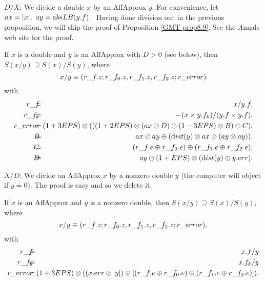 $D/X$:
We   divide a double $x$ by an AffApprox $y$.
For convenience, let $ax = |x|,\ ay = {\textrm absLB}(y.f).\ $  Having done division out in the previous proposition, we will skip the proof of Proposition \ref{GMT prop8.9}.  See the {\textit Annals}
web site for the proof.

\begin{proposition}\label{GMT prop8.9} If $x$ is a double and $y$ is an 
{\textrm AffApprox}  with $D > 0$ {\textrm (}\/see below{\textrm ),}
 then $S(x / y) \supseteq S(x) / S(y)${\textrm ,} where
$$x / y \equiv (r\_f.z; r\_f_0.z, r\_f_1.z, r\_f_2.z; r\_{\textrm error})$$
with
 \begin{eqnarray*}
r\_f&\hskip-8pt =\hskip-8pt& x / y.f,\\
r\_f_k&\hskip-8pt =\hskip-8pt& -(x \times y.f_k)/ (y.f \times y.f),\\
r\_{\textrm error}&\hskip-8pt =\hskip-8pt& (1+3EPS) \otimes ( 
((1 + 2EPS) \otimes (ax  \oslash D) \ominus (1 - 3EPS) \otimes B)
\oplus C),\\
 B&\hskip-8pt =\hskip-8pt& ax \oslash ay  \oplus ({\textrm dist}(y) \otimes ax \oslash (ay \otimes ay)),\\
C& \hskip-8pt=\hskip-8pt& (r\_f.e \oplus r\_f_0.e)
\oplus (r\_f_1.e \oplus r\_f_2.e),\\
D &\hskip-8pt=\hskip-8pt& ay \ominus (1 + EPS) \otimes ({\textrm dist}(y) \oplus y.{\textrm err}).
\end{eqnarray*}
\end{proposition}

$X/D$:
We   divide an AffApprox $x$ by a nonzero double $y$ (the computer will object if $y = 0$).  The proof is easy  and
so we delete it.

\begin{proposition}\label{GMT prop8.10} 
If $x$ is an {\textrm AffApprox}  and $y$ is a nonzero double{\textrm ,} then
$S(x / y) \supseteq S(x) / S(y)${\textrm ,} where
$$x / y \equiv (r\_f.z; r\_f_0.z, r\_f_1.z, r\_f_2.z; r\_{\textrm error}),$$
with
\begin{eqnarray*}
r\_f &\hskip-8pt=\hskip-8pt& x.f / y\\
r\_f_k &\hskip-8pt=\hskip-8pt& x.f_k / y\\
r\_{\textrm error} &\hskip-8pt = \hskip-8pt&
(1+3EPS) \otimes ( 
(x.{\textrm err}\oslash |y|)
\oplus 
[(r\_f.e \oplus r\_f_0.e) \oplus (r\_f_1.e \oplus r\_f_2.e)]
                                               ).\end{eqnarray*}
\end{proposition}

